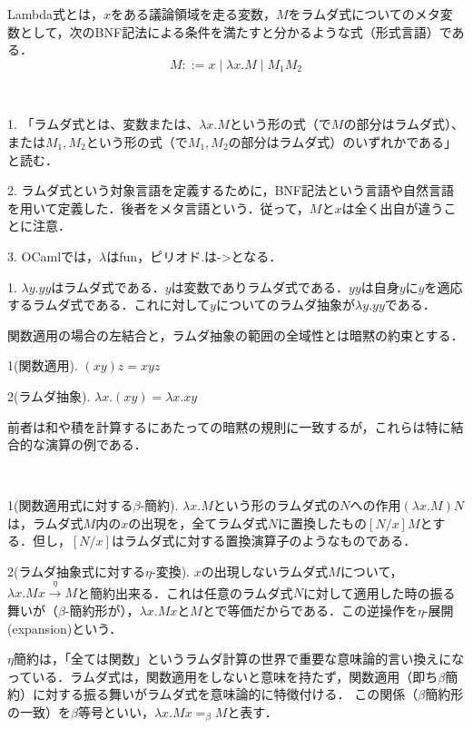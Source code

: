 \documentclass[uplatex, 12pt, dvipdfmx]{jsreport}
\begin{document}
\begin{shadebox}\begin{definition}[Lambda式]
    Lambda式とは，$x$をある議論領域を走る変数，$M$をラムダ式についてのメタ変数として，次のBNF記法による条件を満たすと分かるような式（形式言語）である．
    \[ M::=x\mid\lambda x.M\mid M_1M_2 \]
\end{definition}\end{shadebox}
\begin{remark}　

    1. 「ラムダ式とは、変数または、$\lambda x.M$という形の式（で$M$の部分はラムダ式）、または$M_1,M_2$という形の式（で$M_1,M_2$の部分はラムダ式）のいずれかである」と読む．

    2. ラムダ式という対象言語を定義するために，BNF記法という言語や自然言語を用いて定義した．後者をメタ言語という．従って，$M$と$x$は全く出自が違うことに注意．

    3. OCamlでは，$\lambda$はfun，ピリオド.は->となる．
\end{remark}
\begin{example}

    1. $\lambda y.yy$はラムダ式である．$y$は変数でありラムダ式である．$yy$は自身$y$に$y$を適応するラムダ式である．これに対して$y$についてのラムダ抽象が$\lambda y.yy$である．
\end{example}

\begin{definition}[括弧の除去則]関数適用の場合の左結合と，ラムダ抽象の範囲の全域性とは暗黙の約束とする．
    
    1(関数適用). $(xy)z=xyz$

    2(ラムダ抽象). $\lambda x.(xy)=\lambda x.xy$
\end{definition}
\begin{remark}
    前者は和や積を計算するにあたっての暗黙の規則に一致するが，これらは特に結合的な演算の例である．
\end{remark}

\begin{definition}[計算規則]　

    1(関数適用式に対する$\beta$-簡約). $\lambda x.M$という形のラムダ式の$N$への作用$(\lambda x.M)N$は，ラムダ式$M$内の$x$の出現を，全てラムダ式$N$に置換したもの$[N/x]M$とする．但し，$[N/x]$はラムダ式に対する置換演算子のようなものである．

    2(ラムダ抽象式に対する$\eta$-変換). $x$の出現しないラムダ式$M$について，$\lambda x.Mx\xrightarrow{\eta}M$と簡約出来る．これは任意のラムダ式$N$に対して適用した時の振る舞いが（$\beta$-簡約形が），$\lambda x.Mx$と$M$とで等価だからである．この逆操作を$\eta$-展開(expansion)という．
\end{definition}
\begin{remark}
    $\eta$簡約は，「全ては関数」というラムダ計算の世界で重要な意味論的言い換えになっている．ラムダ式は，関数適用をしないと意味を持たず，関数適用（即ち$\beta$簡約）に対する振る舞いがラムダ式を意味論的に特徴付ける．
    この関係（$\beta$簡約形の一致）を$\beta$等号といい，$\lambda x.Mx=_\beta M$と表す．
\end{remark}
\end{document}

